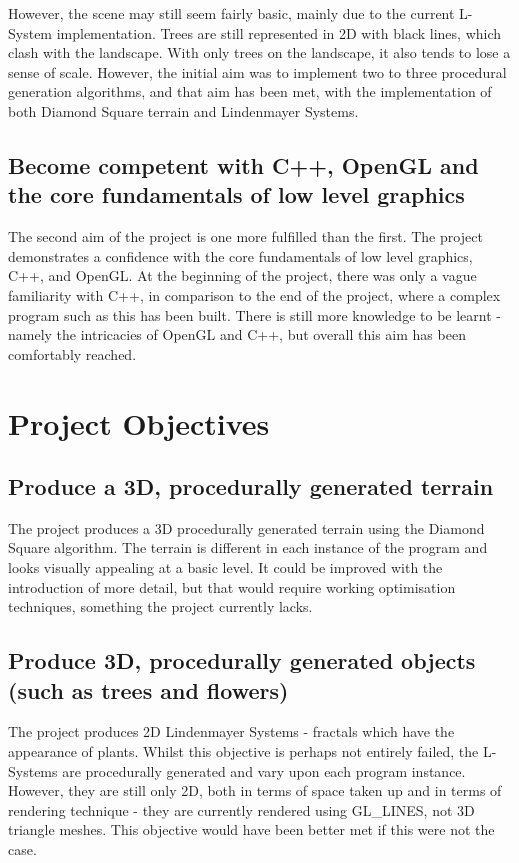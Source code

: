 \documentclass[a4paper,10pt]{report}
\begin{document}
However, the scene may still seem fairly basic, mainly due to the current L-System implementation. Trees are still represented in 2D with black lines, which clash with the landscape. With only trees on the landscape, it also tends to lose a sense of scale. However, the initial aim was to implement two to three procedural generation algorithms, and that aim has been met, with the implementation of both Diamond Square terrain and Lindenmayer Systems. 

\subsection{Become competent with C++, OpenGL and the core fundamentals of low level graphics}

The second aim of the project is one more fulfilled than the first. The project demonstrates a confidence with the core fundamentals of low level graphics, C++, and OpenGL. At the beginning of the project, there was only a vague familiarity with C++, in comparison to the end of the project, where a complex program such as this has been built.  There is still more knowledge to be learnt - namely the intricacies of OpenGL and C++, but overall this aim has been comfortably reached.

\section{Project Objectives}

\subsection{ Produce a 3D, procedurally generated terrain}
The project produces a 3D procedurally generated terrain using the Diamond Square algorithm. The terrain is different in each instance of the program and looks visually appealing at a basic level. It could be improved with the introduction of more detail, but that would require working optimisation techniques, something the project currently lacks.

\subsection{Produce 3D, procedurally generated objects (such as trees and flowers)}

The project produces 2D Lindenmayer Systems - fractals which have the appearance of plants. Whilst this objective is perhaps not entirely failed, the L-Systems are procedurally generated and vary upon each program instance. However, they are still only 2D, both in terms of space taken up and in terms of rendering technique - they are currently rendered using GL\_LINES, not 3D triangle meshes. This objective would have been better met if this were not the case.
\end{document}
